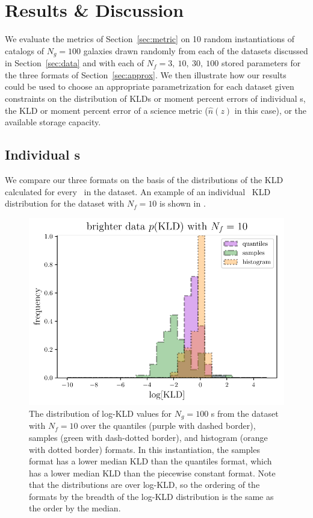 \section{Results \& Discussion}

We evaluate the metrics of Section~\ref{sec:metric} on 10 random instantiations 
of catalogs of $N_{g}=100$ galaxies drawn randomly from each of the datasets 
discussed in Section~\ref{sec:data} and with each of $N_{f}=3,\ 10,\ 30,\ 100$ 
stored parameters for the three formats of Section~\ref{sec:approx}.
We then illustrate how our results could be used to choose an appropriate 
parametrization for each dataset given constraints on the distribution of KLDs 
or moment percent errors of individual \pz s, the KLD or moment percent error 
of a science metric ($\hat{n}(z)$ in this case), or the available storage 
capacity.


\subsection{Individual \pz s}

We compare our three formats on the basis of the distributions of the KLD 
calculated for every \pz\ in the dataset.
An example of an individual \pz\ KLD distribution for the \mgdata dataset with 
$N_{f}=10$ is shown in .
\begin{figure}
	\begin{center}
		\includegraphics[width=0.5\columnwidth]{figures/qp/individual_kld.pdf}
		\caption{The distribution of log-KLD values for $N_{g}=100$ \pz s from the 
			\mgdata dataset with $N_{f}=10$ over the quantiles (purple with dashed border), 
			samples (green with dash-dotted border), and histogram (orange with dotted 
			border) formats.
			In this instantiation, the samples format has a lower median KLD than the 
			quantiles format, which has a lower median KLD than the piecewise constant 
			format.
			Note that the distributions are over log-KLD, so the ordering of the 
			formats by the breadth of the log-KLD distribution is the same as the order by 
			the median.
			}
	\end{center}
\end{figure}

